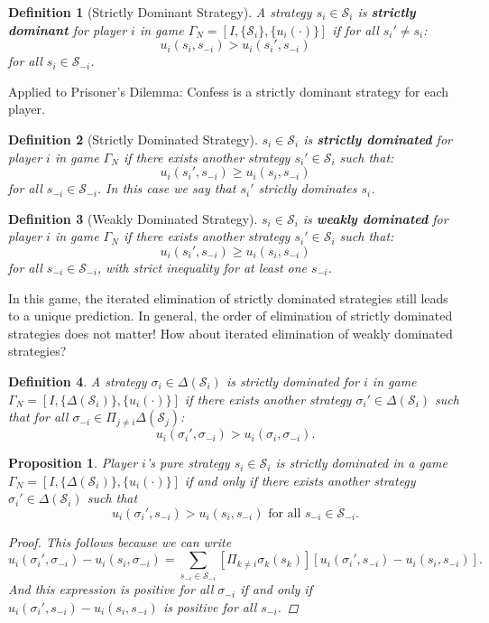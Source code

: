 \documentclass[12pt]{extreport} %
\theoremstyle{named}
\theoremstyle{itshape}
\newtheorem*{definition}{Definition}
\theoremstyle{normal}
\newtheorem{proposition}[unnamedtheorem]{Proposition}
\begin{document}
\begin{definition}[Strictly Dominant Strategy]
	A strategy $s_i \in \mathcal{S}_i$ is \textbf{strictly dominant} for player $i$ in game $\Gamma_N = [I, \{ \mathcal{S}_i \}, \{ u_i(\cdot)\}]$ if for all $s_i' \neq s_i$:
	$$ u_{i}(s_i, s_{-i}) > u_i(s_i', s_{-i})  $$
	for all $s_{i} \in \mathcal{S}_{-i}$.
\end{definition}
Applied to Prisoner's Dilemma: Confess is a strictly dominant strategy for each player.

\begin{definition}[Strictly Dominated Strategy]
	$s_i \in \mathcal{S}_i$ is \textbf{strictly dominated} for player $i$ in game $\Gamma_N$ if there exists another strategy $s_i' \in \mathcal{S}_i$ such that:
	$$ u_i(s_i', s_{-i}) \geq u_i(s_i, s_{-i}) $$
	for all $s_{-i} \in \mathcal{S}_{-i}$. In this case we say that $s_i'$ strictly dominates $s_i$.
\end{definition}

\begin{definition}[Weakly Dominated Strategy]
	$s_i \in \mathcal{S}_{i}$ is \textbf{weakly dominated} for player $i$ in game $\Gamma_N$ if there exists another strategy $s_i' \in \mathcal{S}_i$ such that:
	$$ u_i(s_i', s_{-i}) \geq u_i(s_i, s_{-i}) $$
	for all $s_{-i} \in \mathcal{S}_{-i}$, with strict inequality for at least one $s_{-i}$.
\end{definition}

In this game, the iterated elimination of strictly dominated strategies still leads to a unique prediction. In general, the order of elimination of strictly dominated strategies does not matter! How about iterated elimination of weakly dominated strategies?

\begin{definition}
	A strategy $\sigma_i \in \Delta(\mathcal{S}_i)$ is strictly dominated for $i$ in game $\Gamma_{N} = [I, \{ \Delta(\mathcal{S}_i)\}, \{ u_i(\cdot) \}]$ if there exists another strategy $\sigma_i' \in \Delta(\mathcal{S}_i)$ such that for all $\sigma_{-i} \in \Pi_{j \neq i} \Delta(\mathcal{S}_{j})$:
	$$ u_{i}(\sigma_i', \sigma_{-i}) > u_i(\sigma_i, \sigma_{-i}). $$
\end{definition}


\begin{proposition}
	Player $i$'s pure strategy $s_i \in \mathcal{S}_i$ is strictly dominated in a game $\Gamma_N = [I, \{ \Delta(\mathcal{S}_i)\}, \{ u_i(\cdot)\}]$ if and only if there exists another strategy $\sigma_i' \in \Delta(\mathcal{S}_i)$ such that
	$$ u_i(\sigma_i', s_{-i}) > u_i(s_i, s_{-i}) \text{ for all } s_{-i} \in \mathcal{S}_{-i}. $$
	
	\begin{proof}
		This follows because we can write
		$$ u_i(\sigma_i', \sigma_{-i}) - u_i(s_i, \sigma_{-i}) = \sum_{s_{-i} \in \mathcal{S}_{-i}} \left[ \Pi_{k \neq i} \sigma_{k}(s_{k}) \right] \left[ u_{i}(\sigma_i', s_{-i}) - u_{i}(s_i, s_{-i}) \right]. $$
		And this expression is positive for all $\sigma_{-i}$ if and only if $u_i(\sigma_i', s_{-i}) - u_{i}(s_{i}, s_{-i})$ is positive for all $s_{-i}$.
	\end{proof}
\end{proposition}
\end{document}
